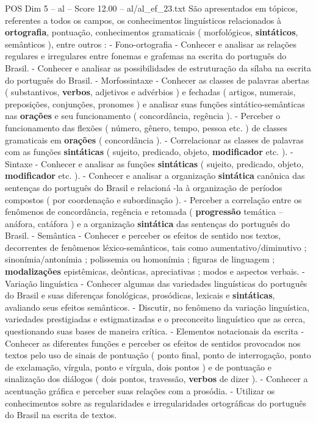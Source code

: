 \begin{textsample}{POS Dim 5 – al – Score 12.00 – al/al\_ef\_23.txt}
São apresentados em tópicos, referentes a todos os campos, os conhecimentos linguísticos relacionados à \textbf{ortografia}, pontuação, conhecimentos gramaticais ( morfológicos, \textbf{sintáticos}, semânticos ), entre outros : - Fono-ortografia - Conhecer e analisar as relações regulares e irregulares entre fonemas e grafemas na escrita do português do Brasil. - Conhecer e analisar as possibilidades de estruturação da sílaba na escrita do português do Brasil. - Morfossintaxe - Conhecer as classes de palavras abertas ( substantivos, \textbf{verbos}, adjetivos e advérbios ) e fechadas ( artigos, numerais, preposições, conjunções, pronomes ) e analisar suas funções sintático-semânticas nas \textbf{orações} e seu funcionamento ( concordância, regência ). - Perceber o funcionamento das flexões ( número, gênero, tempo, pessoa etc. ) de classes gramaticais em \textbf{orações} ( concordância ). - Correlacionar as classes de palavras com as funções \textbf{sintáticas} ( sujeito, predicado, objeto, \textbf{modificador} etc. ). - Sintaxe - Conhecer e analisar as funções \textbf{sintáticas} ( sujeito, predicado, objeto, \textbf{modificador} etc. ). - Conhecer e analisar a organização \textbf{sintática} canônica das sentenças do português do Brasil e relacioná -la à organização de períodos compostos ( por coordenação e subordinação ). - Perceber a correlação entre os fenômenos de concordância, regência e retomada ( \textbf{progressão} temática – anáfora, catáfora ) e a organização \textbf{sintática} das sentenças do português do Brasil. - Semântica - Conhecer e perceber os efeitos de sentido nos textos, decorrentes de fenômenos léxico-semânticos, tais como aumentativo/diminutivo ; sinonímia/antonímia ; polissemia ou homonímia ; figuras de linguagem ; \textbf{modalizações} epistêmicas, deônticas, apreciativas ; modos e aspectos verbais. - Variação linguística - Conhecer algumas das variedades linguísticas do português do Brasil e suas diferenças fonológicas, prosódicas, lexicais e \textbf{sintáticas}, avaliando seus efeitos semânticos. - Discutir, no fenômeno da variação linguística, variedades prestigiadas e estigmatizadas e o preconceito linguístico que as cerca, questionando suas bases de maneira crítica. - Elementos notacionais da escrita - Conhecer as diferentes funções e perceber os efeitos de sentidos provocados nos textos pelo uso de sinais de pontuação ( ponto final, ponto de interrogação, ponto de exclamação, vírgula, ponto e vírgula, dois pontos ) e de pontuação e sinalização dos diálogos ( dois pontos, travessão, \textbf{verbos} de dizer ). - Conhecer a acentuação gráfica e perceber suas relações com a prosódia. - Utilizar os conhecimentos sobre as regularidades e irregularidades ortográficas do português do Brasil na escrita de textos.

\end{textsample}
